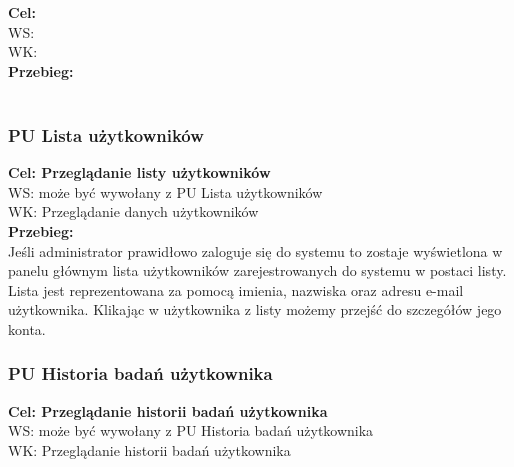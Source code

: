 \documentclass[12pt, letterpaper]{article}
\begin{document}
		\quad
		
		\textbf{Cel: }\\
		
		WS: \\
		
		WK: \\
		
		\textbf{Przebieg:}\\
		 \\
			
		
		
		\subsubsection{PU Lista użytkowników}
		
		\quad
		
		\textbf{Cel: Przeglądanie listy użytkowników}\\
		
		WS: może być wywołany z PU Lista użytkowników\\
		
		WK: Przeglądanie danych użytkowników \\
		
		\textbf{Przebieg:}\\
		Jeśli administrator prawidłowo zaloguje się do systemu to zostaje wyświetlona w panelu głównym lista użytkowników zarejestrowanych do systemu w postaci listy. Lista jest reprezentowana za pomocą imienia, nazwiska oraz adresu e-mail użytkownika. Klikając w użytkownika z listy możemy przejść do szczegółów jego konta.\\	
		
		
		\subsubsection{PU Historia badań użytkownika}
		
		\quad
		
		\textbf{Cel: Przeglądanie historii badań użytkownika}\\
		
		WS: może być wywołany z PU Historia badań użytkownika\\
		
		WK: Przeglądanie historii badań użytkownika \\
		
\end{document}
